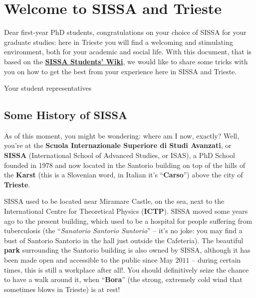 \documentclass{sissavademecum}
\begin{document}
\maketitle
\tableofcontents
\newpage

\setlength{\parskip}{1em}


\chapter{Welcome to SISSA and Trieste}

Dear first-year PhD students, congratulations on your choice of SISSA for your graduate studies: here in Trieste you will find a welcoming and stimulating environment, both for your academic and social life. With this document, that is based on the \href{https://wiki.sissa.it/students/index.php/Main_Page}{\textbf{SISSA Students' Wiki}}, we would like to share some tricks with you on how to get the best from your experience here in SISSA and Trieste. 

\begin{flushright}	
	Your student representatives
\end{flushright}


\section{Some History of SISSA}

As of this moment, you might be wondering: where am I now, exactly? Well, you're at the \textbf{Scuola Internazionale Superiore di Studi Avanzati}, or \textbf{SISSA} (International School of Advanced Studies, or ISAS), a PhD School founded in 1978 and now located in the Santorio building on top of the hills of the \textbf{Karst} (this is a Slovenian word, in Italian it's ``\textbf{Carso}{}'') above the city of \textbf{Trieste}.

SISSA used to be located near Miramare Castle, on the sea, next to the International Centre for Theoretical Physics (\textbf{ICTP}). SISSA moved some years ago to the present building, which used to be a hospital for people suffering from tuberculosis (the ``\textit{Sanatorio Santorio Santorio}{}'' -- it's no joke: you may find a bust of Santorio Santorio in the hall just outside the Cafeteria). The beautiful \textbf{park }surrounding the Santorio building is also owned by SISSA, although it has been made open and accessible to the public since May $2011$ -- during certain times, this is still a workplace after all!. You should definitively seize the chance to have a walk around it, when ``\textbf{Bora}{}'' (the strong, extremely cold wind that sometimes blows in Trieste) is at rest!
\end{document}
